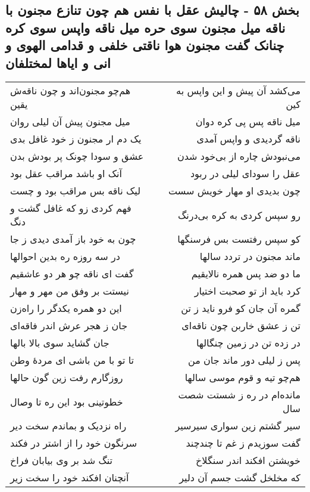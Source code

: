 \begin{center}
\section*{بخش ۵۸ - چالیش عقل با نفس هم چون تنازع  مجنون با ناقه میل مجنون  سوی حره میل ناقه واپس سوی کره  چنانک گفت مجنون هوا ناقتی خلفی و قدامی الهوی  و انی و ایاها لمختلفان}
\label{sec:sh058}
\begin{longtable}{l p{0.5cm} r}
هم‌چو مجنون‌اند و چون ناقه‌ش یقین
&&
می‌کشد آن پیش و این واپس به کین
\\
میل مجنون پیش آن لیلی روان
&&
میل ناقه پس پی کره دوان
\\
یک دم ار مجنون ز خود غافل بدی
&&
ناقه گردیدی و واپس آمدی
\\
عشق و سودا چونک پر بودش بدن
&&
می‌نبودش چاره از بی‌خود شدن
\\
آنک او باشد مراقب عقل بود
&&
عقل را سودای لیلی در ربود
\\
لیک ناقه بس مراقب بود و چست
&&
چون بدیدی او مهار خویش سست
\\
فهم کردی زو که غافل گشت و دنگ
&&
رو سپس کردی به کره بی‌درنگ
\\
چون به خود باز آمدی دیدی ز جا
&&
کو سپس رفتست بس فرسنگها
\\
در سه روزه ره بدین احوالها
&&
ماند مجنون در تردد سالها
\\
گفت ای ناقه چو هر دو عاشقیم
&&
ما دو ضد پس همره نالایقیم
\\
نیستت بر وفق من مهر و مهار
&&
کرد باید از تو صحبت اختیار
\\
این دو همره یکدگر را راه‌زن
&&
گمره آن جان کو فرو ناید ز تن
\\
جان ز هجر عرش اندر فاقه‌ای
&&
تن ز عشق خاربن چون ناقه‌ای
\\
جان گشاید سوی بالا بالها
&&
در زده تن در زمین چنگالها
\\
تا تو با من باشی ای مردهٔ وطن
&&
پس ز لیلی دور ماند جان من
\\
روزگارم رفت زین گون حالها
&&
هم‌چو تیه و قوم موسی سالها
\\
خطوتینی بود این ره تا وصال
&&
مانده‌ام در ره ز شستت شصت سال
\\
راه نزدیک و بماندم سخت دیر
&&
سیر گشتم زین سواری سیرسیر
\\
سرنگون خود را از اشتر در فکند
&&
گفت سوزیدم ز غم تا چندچند
\\
تنگ شد بر وی بیابان فراخ
&&
خویشتن افکند اندر سنگلاخ
\\
آنچنان افکند خود را سخت زیر
&&
که مخلخل گشت جسم آن دلیر

\end{longtable}
\end{center}

